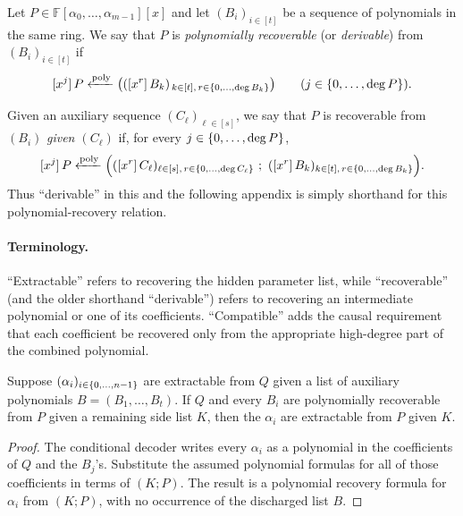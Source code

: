 \begin{definition}
    Let $P\in\mathbb{F}[\alpha_0,\ldots,\alpha_{m-1}][x]$ and let
    $(B_i)_{i\in[t]}$ be a sequence of polynomials in the same ring.  We say
    that $P$ is \emph{polynomially recoverable} (or \emph{derivable}) from
    $(B_i)_{i\in[t]}$ if
    \[
        \coeff{P}{j}\polyfrom
        \bigl((\coeff{B_k}{r})_{\,k\in[t],\,r\in\idx{\deg B_k}}\bigr)
        \qquad(j\in\idx{\deg P}).
    \]

    Given an auxiliary sequence $(C_\ell)_{\ell\in[s]}$, we say that $P$ is
    recoverable from $(B_i)$ \emph{given $(C_\ell)$} if, for every
    $j\in\idx{\deg P}$,
    \[
       \coeff{P}{j}\polyfrom
       \Bigl((\coeff{C_\ell}{r})_{\ell\in[s],\,r\in\idx{\deg C_\ell}}\ ;\
             (\coeff{B_k}{r})_{k\in[t],\,r\in\idx{\deg B_k}}\Bigr).
    \]
    Thus ``derivable'' in this and the following appendix is simply shorthand
    for this polynomial-recovery relation.
\end{definition}

\paragraph{Terminology.}
``Extractable'' refers to recovering the hidden parameter list, while
``recoverable'' (and the older shorthand ``derivable'') refers to recovering
an intermediate polynomial or one of its coefficients.  ``Compatible'' adds
the causal requirement that each coefficient be recovered only from the
appropriate high-degree part of the combined polynomial.

\begin{lemma}
\label{lem:discharge-side-information}
Suppose $(\alpha_i)_{i\in\rng n}$ are extractable from $Q$ given a list of
auxiliary polynomials $B=(B_1,\ldots,B_t)$.  If $Q$ and every $B_i$ are
polynomially recoverable from $P$ given a remaining side list $K$, then the
$\alpha_i$ are extractable from $P$ given $K$.
\end{lemma}
\begin{proof}
The conditional decoder writes every $\alpha_i$ as a polynomial in the
coefficients of $Q$ and the $B_j$'s.  Substitute the assumed polynomial
formulas for all of those coefficients in terms of $(K;P)$.  The result is a
polynomial recovery formula for $\alpha_i$ from $(K;P)$, with no occurrence
of the discharged list $B$.
\end{proof}

